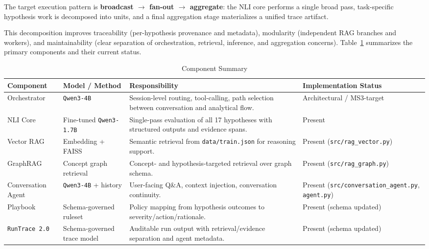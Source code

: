\documentclass[11pt]{article}
\begin{document}
The target execution pattern is \textbf{broadcast $\rightarrow$ fan-out $\rightarrow$ aggregate}: the NLI core performs a single broad pass, task-specific hypothesis work is decomposed into units, and a final aggregation stage materializes a unified trace artifact.

This decomposition improves traceability (per-hypothesis provenance and metadata), modularity (independent RAG branches and workers), and maintainability (clear separation of orchestration, retrieval, inference, and aggregation concerns). Table~\ref{tab:component-summary} summarizes the primary components and their current status.

\begin{table}[htbp]
\centering
\caption{Component Summary}
\label{tab:component-summary}
\small
\begin{tabularx}{\textwidth}{>{\raggedright\arraybackslash}p{2.2cm} >{\raggedright\arraybackslash}p{2.3cm} >{\raggedright\arraybackslash}X >{\raggedright\arraybackslash}p{2.6cm}}
\toprule
\textbf{Component} & \textbf{Model / Method} & \textbf{Responsibility} & \textbf{Implementation Status} \\
\midrule
Orchestrator & \texttt{Qwen3-4B} & Session-level routing, tool-calling, path selection between conversation and analytical flow. & Architectural / MS3-target \\
NLI Core & Fine-tuned \texttt{Qwen3-1.7B} & Single-pass evaluation of all 17 hypotheses with structured outputs and evidence spans. & Present \\
Vector RAG & Embedding + FAISS & Semantic retrieval from \texttt{data/train.json} for reasoning support. & Present (\texttt{src/rag\_vector.py}) \\
GraphRAG & Concept graph retrieval & Concept- and hypothesis-targeted retrieval over graph schema. & Present (\texttt{src/rag\_graph.py}) \\
Conversation Agent & \texttt{Qwen3-4B} + history & User-facing Q\&A, context injection, conversation continuity. & Present (\texttt{src/conversation\_agent.py}, \texttt{agent.py}) \\
Playbook & Schema-governed ruleset & Policy mapping from hypothesis outcomes to severity/action/rationale. & Present (schema updated) \\
\texttt{RunTrace 2.0} & Schema-governed trace model & Auditable run output with retrieval/evidence separation and agent metadata. & Present (schema updated) \\
\bottomrule
\end{tabularx}
\end{table}
\end{document}
